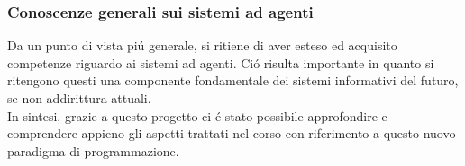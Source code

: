 \subsubsection{Conoscenze generali sui sistemi ad agenti}
Da un punto di vista pi\'u generale, si ritiene di aver esteso ed acquisito competenze riguardo ai sistemi ad agenti. Ci\'o risulta importante in quanto si ritengono questi una componente fondamentale dei sistemi informativi del futuro, se non addirittura attuali.\\
In sintesi, grazie a questo progetto ci \'e stato possibile approfondire e comprendere appieno gli aspetti trattati nel corso con riferimento a questo nuovo paradigma
di programmazione.


